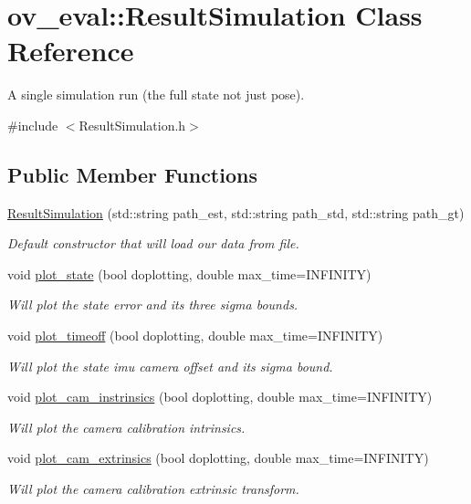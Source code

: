 \hypertarget{classov__eval_1_1ResultSimulation}{}\section{ov\+\_\+eval\+:\+:Result\+Simulation Class Reference}
\label{classov__eval_1_1ResultSimulation}


A single simulation run (the full state not just pose).  




{\ttfamily \#include $<$Result\+Simulation.\+h$>$}

\subsection*{Public Member Functions}
\begin{DoxyCompactItemize}
\item 
\hyperlink{classov__eval_1_1ResultSimulation_ad75bc6dc74af33a2ecdf0c8eca44ecca}{Result\+Simulation} (std\+::string path\+\_\+est, std\+::string path\+\_\+std, std\+::string path\+\_\+gt)
\begin{DoxyCompactList}\small\item\em Default constructor that will load our data from file. \end{DoxyCompactList}\item 
void \hyperlink{classov__eval_1_1ResultSimulation_aa7e8b0be0f423f9b77d29b0fb41cc715}{plot\+\_\+state} (bool doplotting, double max\+\_\+time=I\+N\+F\+I\+N\+I\+TY)
\begin{DoxyCompactList}\small\item\em Will plot the state error and its three sigma bounds. \end{DoxyCompactList}\item 
void \hyperlink{classov__eval_1_1ResultSimulation_a3d927f6bd6eaf6eba2b5a067920ef662}{plot\+\_\+timeoff} (bool doplotting, double max\+\_\+time=I\+N\+F\+I\+N\+I\+TY)
\begin{DoxyCompactList}\small\item\em Will plot the state imu camera offset and its sigma bound. \end{DoxyCompactList}\item 
void \hyperlink{classov__eval_1_1ResultSimulation_abb8a9eeb8c5e9b21c0558f27d4a9cf9a}{plot\+\_\+cam\+\_\+instrinsics} (bool doplotting, double max\+\_\+time=I\+N\+F\+I\+N\+I\+TY)
\begin{DoxyCompactList}\small\item\em Will plot the camera calibration intrinsics. \end{DoxyCompactList}\item 
void \hyperlink{classov__eval_1_1ResultSimulation_a7f2f0d71c2b3d2f9db44ceb9542a8d9e}{plot\+\_\+cam\+\_\+extrinsics} (bool doplotting, double max\+\_\+time=I\+N\+F\+I\+N\+I\+TY)
\begin{DoxyCompactList}\small\item\em Will plot the camera calibration extrinsic transform. \end{DoxyCompactList}\end{DoxyCompactItemize}
